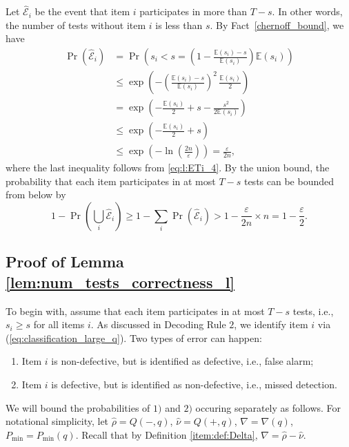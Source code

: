 \documentclass[onecolumn,letterpaper]{IEEEtran}
\newcommand{\cp}{{q}}
\newcommand{\mo}{{s}}
\newcommand{\moi}{{\mo_{i}}}
\newcommand{\pmin}{{P_{\min}(\cp)}}
\newcommand{\spn}{{\rho}}
\newcommand{\spp}{{\nu}}
\newcommand{\spmin}{{P_{\min}}}
\newcommand{\cEl}{{\hat{\mathcal{E}}}}
\newcommand{\spnl}{{\hat{\spn}}}
\newcommand{\sppl}{{\hat{\spp}}}
\newcommand{\spgapl}{{\nabla}}
\newcommand{\pnm}{{Q(-,\cp)}}
\newcommand{\ppm}{{Q(+,\cp)}}
\newcommand{\pgapm}{{\nabla(\cp)}}
\begin{document}
Let $\cEl_i$ be the event that item $i$ participates in more than $T-\mo$.  In other words, the number of tests without item $i$ is less than $\mo$. By Fact~\ref{chernoff_bound}, we have
    \begin{align*}
    \Pr (\cEl_i)&= \Pr \left(\moi < \mo = \left( 1 - \frac{ \mathbb{E}(\moi)-\mo}{ \mathbb{E}(\moi)} \right)  \mathbb{E}(\moi) \right) \\
    &\leq \exp \left( - \left( \frac{ \mathbb{E}(\moi)-\mo}{ \mathbb{E}(\moi)} \right)^2 \, \frac{ \mathbb{E}(\moi)}{2} \right) \\
    &= \exp \left( - \frac{ \mathbb{E}(\moi)}{2} + \mo - \frac{\mo^2}{2 \mathbb{E}(\moi)} \right) \\
    &\leq \exp \left( -\frac{ \mathbb{E}(\moi)}{2} + \mo \right) \\
    &\leq \exp \left( -\ln \left( \frac{2n}{\varepsilon} \right) \right)
    = \frac{\varepsilon}{2n},
    \end{align*} 
    where the last inequality follows from \eqref{eq:l:ETi_4}.
By the union bound, the probability that each item participates in at most $T-\mo$ tests can be bounded from below by
\begin{equation}
    1 - \Pr\left( \bigcup\limits_{i}\cEl_i \right) \ge 1 - \sum\limits_i \Pr(\cEl_i) > 1 - \frac{\varepsilon}{2n} \times n = 1 - \frac{\varepsilon}{2}.
\end{equation}

\subsection{Proof of Lemma \ref{lem:num_tests_correctness_l}}
\label{sec:num_tests_correctness_l}
To begin with, assume that each item participates in at most $T-\mo$ tests, i.e., $\moi \ge \mo$ for all items $i$. As discussed in Decoding Rule $2$, we identify item $i$ via (\ref{eq:classification_large_q}). Two types of error can happen:
\begin{enumerate}
\item Item $i$ is non-defective, but is identified as defective, i.e., false alarm;
\item Item $i$ is defective, but is identified as non-defective, i.e., missed detection.
\end{enumerate}
We will bound the probabilities of $1)$ and $2)$ occuring separately as follows. For notational simplicity, let $\spnl = \pnm$, $\sppl = \ppm$, $\spgapl = \pgapm$, $\spmin = \pmin$. Recall that by Definition \ref{item:def:Delta}, $\spgapl=\spnl-\sppl $. %
\end{document}
